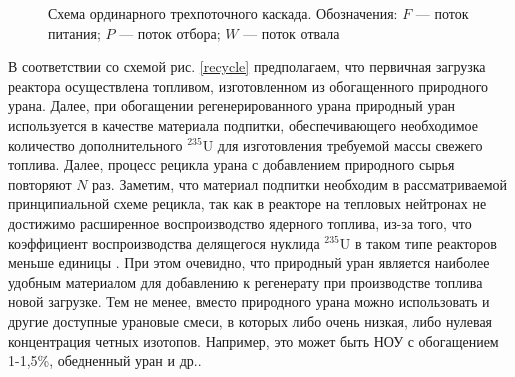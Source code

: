 \begin{figure}[ht]
  \caption{Схема ординарного трехпоточного каскада. Обозначения: $F$ --- поток питания; $P$ --- поток отбора; $W$ --- поток отвала}\label{ordinary}
\end{figure}

В соответствии со схемой рис. \ref{recycle} предполагаем, что первичная загрузка реактора осуществлена топливом, изготовленном из обогащенного природного урана. Далее, при обогащении регенерированного урана природный уран используется в качестве материала подпитки, обеспечивающего необходимое количество дополнительного $^{235}$U для изготовления требуемой массы свежего топлива. Далее, процесс рецикла урана с добавлением природного сырья повторяют $N$ раз. Заметим, что материал подпитки необходим в рассматриваемой принципиальной схеме рецикла, так как в реакторе на тепловых нейтронах не достижимо расширенное воспроизводство ядерного топлива, из-за того, что коэффициент воспроизводства делящегося нуклида $^{235}$U в таком типе реакторов меньше единицы \cite{ignatevVliyanieVidaTopliva2020}. При этом очевидно, что природный уран является наиболее удобным материалом для добавлению к регенерату при производстве топлива новой загрузке. Тем не менее, вместо природного урана можно использовать и другие доступные урановые смеси, в которых либо очень низкая, либо нулевая концентрация четных изотопов. Например, это может быть НОУ с обогащением 1-1,5\%, обедненный уран и др..


